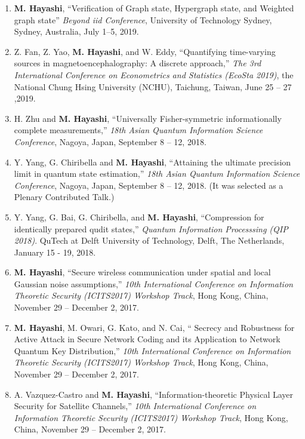 \documentclass[a4paper,12pt,oneside]{article}
\begin{document}
\begin{enumerate}
\item 
\textbf{M. Hayashi}, 
``Verification of Graph state, Hypergraph state, and Weighted graph state''
{\em Beyond iid Conference},
University of Technology Sydney, Sydney, Australia, 
July 1--5, 2019.

\item 
Z. Fan, Z. Yao, \textbf{M. Hayashi}, and W. Eddy,
``Quantifying time-varying sources in magnetoencephalography: A discrete approach,''
{\em The 3rd International Conference on Econometrics and Statistics (EcoSta 2019)},
the National Chung Hsing University (NCHU), Taichung, Taiwan, June 25 -- 27 ,2019.

\item 
H. Zhu and \textbf{M. Hayashi},
``Universally Fisher-symmetric informationally complete measurements,''
{\em 18th Asian Quantum Information Science Conference},
Nagoya, Japan, September 8 -- 12, 2018.

\item 
Y. Yang, G. Chiribella and \textbf{M. Hayashi},
``Attaining the ultimate precision limit in quantum state estimation,''
{\em 18th Asian Quantum Information Science Conference},
Nagoya, Japan, September 8 -- 12, 2018.
(It was selected as a Plenary Contributed Talk.)

\item 
Y. Yang, G. Bai, G. Chiribella, and \textbf{M. Hayashi}, 
``Compression for identically prepared qudit states,'' 
{\em Quantum Information Processsing (QIP 2018)}.
QuTech at Delft University of Technology, Delft, The Netherlands,
January 15 - 19, 2018.

\item 
\textbf{M. Hayashi},
``Secure wireless communication under spatial and local Gaussian noise assumptions,''
{\em 10th International Conference on Information Theoretic Security (ICITS2017) Workshop Track}, 
Hong Kong, China, November 29  -- December 2, 2017.


\item 
\textbf{M. Hayashi}, M. Owari, G. Kato, and N. Cai,
`` Secrecy and Robustness for Active Attack in Secure Network Coding and its Application to  Network Quantum Key Distribution,''
{\em 10th International Conference on Information Theoretic Security (ICITS2017) Workshop Track}, 
Hong Kong, China, November 29  -- December 2, 2017.


\item 
A. Vazquez-Castro and \textbf{M. Hayashi},
``Information-theoretic Physical Layer Security for Satellite Channels,''
{\em 10th International Conference on Information Theoretic Security (ICITS2017) Workshop Track}, 
Hong Kong, China, November 29  -- December 2, 2017.


\end{enumerate}
\end{document}
